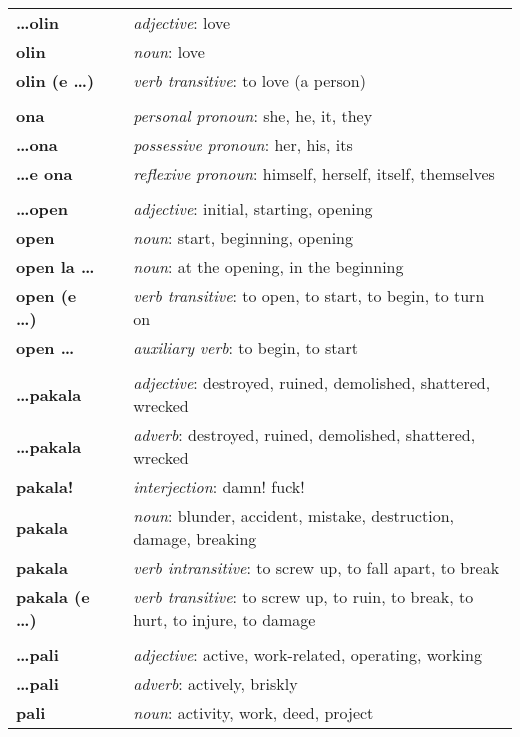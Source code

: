 \begin{supertabular}{p{2,5cm}|ll}
\textbf{\dots olin} && \textit{adjective}: love \\ 
\textbf{olin} && \textit{noun}: love \\ 
\textbf{olin (e \dots)} && \textit{verb transitive}: to love (a person) \\ 
 && \\ %
\textbf{ona} && \textit{personal pronoun}: she, he, it, they \\ 
\textbf{\dots ona} && \textit{possessive pronoun}: her, his, its \\  
\textbf{\dots e ona} && \textit{reflexive pronoun}: himself, herself, itself, themselves \\  
 && \\ %
\textbf{\dots open} && \textit{adjective}: initial, starting, opening \\ 
\textbf{open} && \textit{noun}: start, beginning, opening \\ 
\textbf{open la \dots} && \textit{noun}: at the opening, in the beginning  \\ 
\textbf{open (e \dots)} && \textit{verb transitive}: to open, to start, to begin, to turn on \\ 
\textbf{open \dots } && \textit{auxiliary verb}: to begin, to start \\ 
 && \\ %
\textbf{\dots pakala} && \textit{adjective}: destroyed, ruined, demolished, shattered, wrecked \\ 
\textbf{\dots pakala} && \textit{adverb}: destroyed, ruined, demolished, shattered, wrecked \\ 
\textbf{pakala!} && \textit{interjection}: damn! fuck! \\ 
\textbf{pakala} && \textit{noun}: blunder, accident, mistake, destruction, damage, breaking \\ 
\textbf{pakala} && \textit{verb intransitive}: to screw up, to fall apart, to break \\ 
\textbf{pakala (e \dots)} && \textit{verb transitive}: to screw up, to ruin, to break, to hurt, to injure, to damage \\ 
 && \\ %
\textbf{\dots pali} && \textit{adjective}: active, work-related, operating, working \\ 
\textbf{\dots pali} && \textit{adverb}: actively, briskly \\ 
\textbf{pali} && \textit{noun}: activity, work, deed, project \\ 

\end{supertabular}

